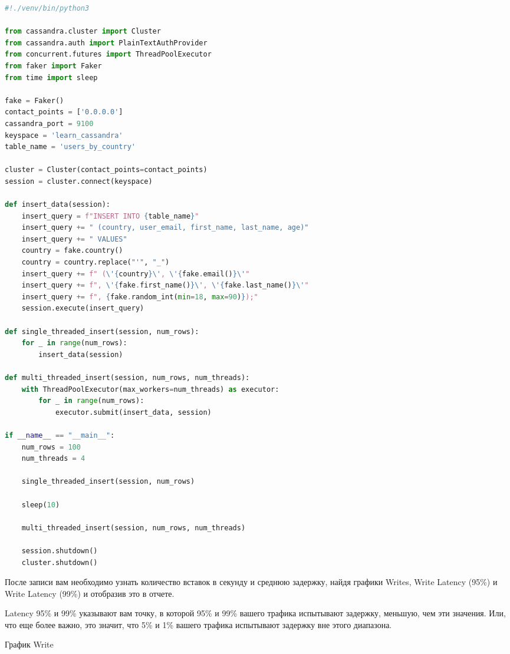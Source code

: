 \begin{lstlisting}[language=Python]
#!./venv/bin/python3

from cassandra.cluster import Cluster
from cassandra.auth import PlainTextAuthProvider
from concurrent.futures import ThreadPoolExecutor
from faker import Faker
from time import sleep

fake = Faker()
contact_points = ['0.0.0.0']
cassandra_port = 9100
keyspace = 'learn_cassandra'
table_name = 'users_by_country'

cluster = Cluster(contact_points=contact_points)
session = cluster.connect(keyspace)

def insert_data(session):
    insert_query = f"INSERT INTO {table_name}"
    insert_query += " (country, user_email, first_name, last_name, age)"
    insert_query += " VALUES"
    country = fake.country()
    country = country.replace("'", "_")
    insert_query += f" (\'{country}\', \'{fake.email()}\'"
    insert_query += f", \'{fake.first_name()}\', \'{fake.last_name()}\'"
    insert_query += f", {fake.random_int(min=18, max=90)});"
    session.execute(insert_query)

def single_threaded_insert(session, num_rows):
    for _ in range(num_rows):
        insert_data(session)

def multi_threaded_insert(session, num_rows, num_threads):
    with ThreadPoolExecutor(max_workers=num_threads) as executor:
        for _ in range(num_rows):
            executor.submit(insert_data, session)

if __name__ == "__main__":
    num_rows = 100
    num_threads = 4

    single_threaded_insert(session, num_rows)

    sleep(10)

    multi_threaded_insert(session, num_rows, num_threads)

    session.shutdown()
    cluster.shutdown()
\end{lstlisting}


После записи вам необходимо узнать количество вставок в секунду и
среднюю задержку, найдя графики Writes, Write Latency (95\%) и Write Latency
(99\%) и отобразив это в отчете.\par
Latency 95\% и 99\% указывают вам точку, в которой 95\% и 99\% вашего
трафика испытывают задержку, меньшую, чем эти значения. Или, что еще более
важно, это значит, что 5\% и 1\% вашего трафика испытывают задержку вне этого
диапазона.

\begin{image}
	\caption{График Write}
	\label{fig:writing}
\end{image}

